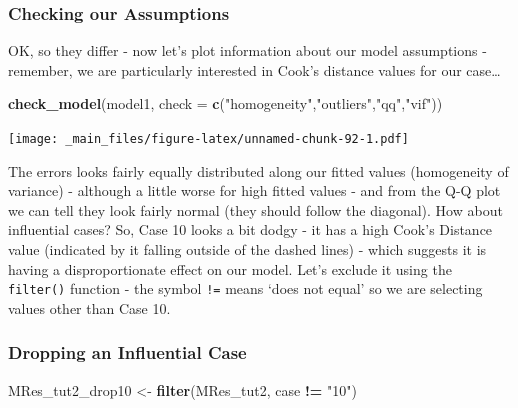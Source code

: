 \documentclass[
]{book}
\newenvironment{Shaded}{\begin{snugshade}}{\end{snugshade}}
\newcommand{\AttributeTok}[1]{\textcolor[rgb]{0.13,0.29,0.53}{#1}}
\newcommand{\FunctionTok}[1]{\textcolor[rgb]{0.13,0.29,0.53}{\textbf{#1}}}
\newcommand{\NormalTok}[1]{#1}
\newcommand{\OtherTok}[1]{\textcolor[rgb]{0.56,0.35,0.01}{#1}}
\newcommand{\SpecialCharTok}[1]{\textcolor[rgb]{0.81,0.36,0.00}{\textbf{#1}}}
\newcommand{\StringTok}[1]{\textcolor[rgb]{0.31,0.60,0.02}{#1}}
\begin{document}
\hypertarget{checking-our-assumptions-1}{%
\subsubsection*{Checking our Assumptions}\label{checking-our-assumptions-1}}

OK, so they differ - now let's plot information about our model assumptions - remember, we are particularly interested in Cook's distance values for our case\ldots{}

\begin{Shaded}
\begin{Highlighting}[]
\FunctionTok{check\_model}\NormalTok{(model1, }\AttributeTok{check =} \FunctionTok{c}\NormalTok{(}\StringTok{"homogeneity"}\NormalTok{,}\StringTok{"outliers"}\NormalTok{,}\StringTok{"qq"}\NormalTok{,}\StringTok{"vif"}\NormalTok{))}
\end{Highlighting}
\end{Shaded}

\texttt{[image: \_main\_files/figure-latex/unnamed-chunk-92-1.pdf]}

The errors looks fairly equally distributed along our fitted values (homogeneity of variance) - although a little worse for high fitted values - and from the Q-Q plot we can tell they look fairly normal (they should follow the diagonal). How about influential cases? So, Case 10 looks a bit dodgy - it has a high Cook's Distance value (indicated by it falling outside of the dashed lines) - which suggests it is having a disproportionate effect on our model. Let's exclude it using the \texttt{filter()} function - the symbol \texttt{!=} means `does not equal' so we are selecting values other than Case 10.

\hypertarget{dropping-an-influential-case}{%
\subsubsection*{Dropping an Influential Case}\label{dropping-an-influential-case}}

\begin{Shaded}
\begin{Highlighting}[]
\NormalTok{MRes\_tut2\_drop10 }\OtherTok{\textless{}{-}} \FunctionTok{filter}\NormalTok{(MRes\_tut2, case }\SpecialCharTok{!=} \StringTok{"10"}\NormalTok{)}
\end{Highlighting}
\end{Shaded}
\end{document}
